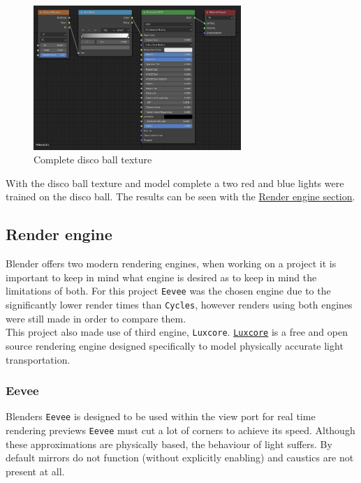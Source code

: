 \documentclass[11pt]{article}
\begin{document}
\begin{figure}[htbp]
\centering
\includegraphics[width=0.7\textwidth]{Images/discoball_texture.png}
\caption{Complete disco ball texture}
\end{figure}
\newpage
With the disco ball texture and model complete a two red and blue lights were
trained on the disco ball. The results can be seen with the \hyperref[sec:orgcab3e82]{Render engine section}.
\subsection{Render engine}
\label{sec:orgcab3e82}
Blender offers two modern rendering engines, when working on a project it is
important to keep in mind what engine is desired as to keep in mind the
limitations of both. For this project \texttt{Eevee} was the chosen engine due to the
significantly lower render times than \texttt{Cycles}, however renders using both
engines were still made in order to compare them.\\

This project also made use of third engine, \texttt{Luxcore}. \href{https://luxcorerender.org/}{\texttt{Luxcore}} is a free and
open source rendering engine designed specifically to model physically accurate
light transportation.
\newpage
\subsubsection{Eevee}
\label{sec:org23a6be1}
Blenders \texttt{Eevee} is designed to be used within the view port for real time rendering previews
\texttt{Eevee} must cut a lot of corners to achieve its speed. Although these
approximations are physically based, the behaviour of light suffers. By default
mirrors do not function (without explicitly enabling) and caustics are not present at all.\\
\end{document}
